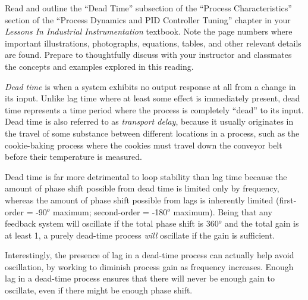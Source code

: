 

Read and outline the ``Dead Time'' subsection of the ``Process Characteristics'' section of the ``Process Dynamics and PID Controller Tuning'' chapter in your {\it Lessons In Industrial Instrumentation} textbook.  Note the page numbers where important illustrations, photographs, equations, tables, and other relevant details are found.  Prepare to thoughtfully discuss with your instructor and classmates the concepts and examples explored in this reading.














{\it Dead time} is when a system exhibits no output response at all from a change in its input.  Unlike lag time where at least some effect is immediately present, dead time represents a time period where the process is completely ``dead'' to its input.  Dead time is also referred to as {\it transport delay}, because it usually originates in the travel of some substance between different locations in a process, such as the cookie-baking process where the cookies must travel down the conveyor belt before their temperature is measured.

\vskip 10pt

Dead time is far more detrimental to loop stability than lag time because the amount of phase shift possible from dead time is limited only by frequency, whereas the amount of phase shift possible from lags is inherently limited (first-order = -90$^{o}$ maximum; second-order = -180$^{o}$ maximum).  Being that any feedback system will oscillate if the total phase shift is 360$^{o}$ and the total gain is at least 1, a purely dead-time process {\it will} oscillate if the gain is sufficient.  

Interestingly, the presence of lag in a dead-time process can actually help avoid oscillation, by working to diminish process gain as frequency increases.  Enough lag in a dead-time process ensures that there will never be enough gain to oscillate, even if there might be enough phase shift.

